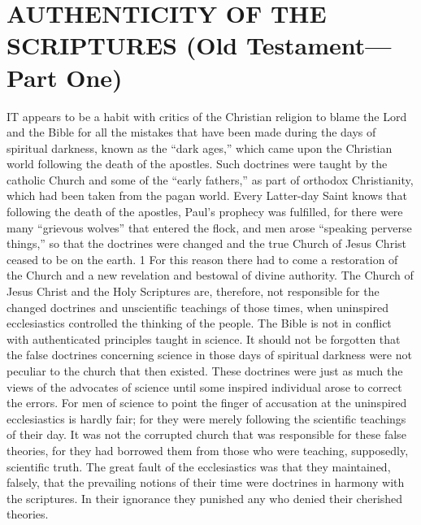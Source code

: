 \chapter{AUTHENTICITY OF THE SCRIPTURES (Old Testament—Part One)}

IT appears to be a habit with critics of the Christian religion to blame the Lord and the Bible
for all the mistakes that have been made during the days of spiritual darkness, known as the
``dark ages,'' which came upon the Christian world following the death of the apostles. Such
doctrines were taught by the catholic Church and some of the ``early fathers,'' as part of
orthodox Christianity, which had been taken from the pagan world. Every Latter-day Saint
knows that following the death of the apostles, Paul's prophecy was fulfilled, for there were
many ``grievous wolves'' that entered the flock, and men arose ``speaking perverse things,'' so
that the doctrines were changed and the true Church of Jesus Christ ceased to be on the earth.
1 For this reason there had to come a restoration of the Church and a new revelation and
bestowal of divine authority. The Church of Jesus Christ and the Holy Scriptures are,
therefore, not responsible for the changed doctrines and unscientific teachings of those times,
when uninspired ecclesiastics controlled the thinking of the people. The Bible is not in
conflict with authenticated principles taught in science. It should not be forgotten that the
false doctrines concerning science in those days of spiritual darkness were not peculiar to the
church that then existed. These doctrines were just as much the views of the advocates of
science until some inspired individual arose to correct the errors. For men of science to point
the finger of accusation at the uninspired ecclesiastics is hardly fair; for they were merely
following the scientific teachings of their day. It was not the corrupted church that was
responsible for these false theories, for they had borrowed them from those who were
teaching, supposedly, scientific truth. The great fault of the ecclesiastics was that they
maintained, falsely, that the prevailing notions of their time were doctrines in harmony with
the scriptures. In their ignorance they punished any who denied their cherished theories.

